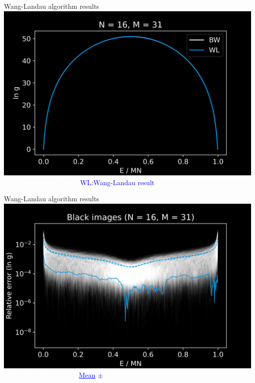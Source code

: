 \documentclass[14pt,c]{beamer}
\begin{document}
\begin{frame}{Wang-Landau algorithm results}
  \centering
  \includegraphics[width=0.9\framewidth]{wanglandau-bw}
  \\
  \small
  \textcolor{white}{BW:\@ Black/white (exact)} \;
  \textcolor{blue}{WL:\@ Wang-Landau result}
\end{frame}

\begin{frame}{Wang-Landau algorithm results}
  \centering
  \includegraphics[width=0.9\framewidth]{wanglandau-bw-relerror}
  \\
  \small
  \textcolor{white}{Black image simulations} \;
  \textcolor{blue}{\uline{Mean} $\pm$ }
\end{frame}
\end{document}
